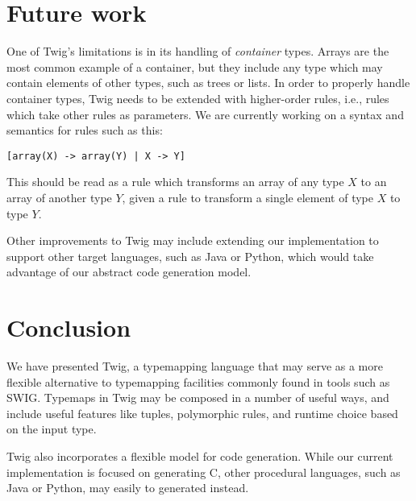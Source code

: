 
\section{Future work}

One of Twig's limitations is in its handling of \emph{container} types. Arrays are the most common example of a container, but they include any type which may contain elements of other types, such as trees or lists. In order to properly handle container types, Twig needs to be extended with higher-order rules, i.e., rules which take other rules as parameters. We are currently working on a syntax and semantics for rules such as this:

\begin{verbatim}
[array(X) -> array(Y) | X -> Y]
\end{verbatim}

This should be read as a rule which transforms an array of any type $X$ to an array of another type $Y$, given a rule to transform a single element of type $X$ to type $Y$.

Other improvements to Twig may include extending our implementation to support other target languages, such as Java or Python, which would take advantage of our abstract code generation model.

\section{Conclusion}

We have presented Twig, a typemapping language that may serve as a more flexible alternative to typemapping facilities commonly found in tools such as SWIG. Typemaps in Twig may be composed in a number of useful ways, and include useful features like tuples, polymorphic rules, and runtime choice based on the input type.

Twig also incorporates a flexible model for code generation. While our current implementation is focused on generating C, other procedural languages, such as Java or Python, may easily to generated instead.
